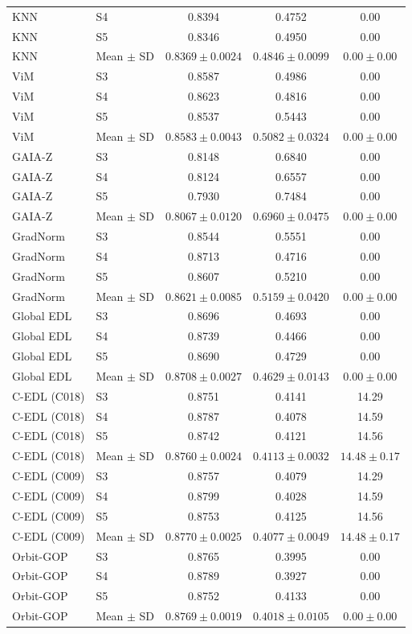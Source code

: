 \begin{longtable}{@{}llccc@{}}
KNN & S4 & 0.8394 & 0.4752 & 0.00 \\
KNN & S5 & 0.8346 & 0.4950 & 0.00 \\
KNN & Mean $\pm$ SD & $0.8369 \pm 0.0024$ & $0.4846 \pm 0.0099$ & $0.00 \pm 0.00$ \\
ViM & S3 & 0.8587 & 0.4986 & 0.00 \\
ViM & S4 & 0.8623 & 0.4816 & 0.00 \\
ViM & S5 & 0.8537 & 0.5443 & 0.00 \\
ViM & Mean $\pm$ SD & $0.8583 \pm 0.0043$ & $0.5082 \pm 0.0324$ & $0.00 \pm 0.00$ \\
GAIA-Z & S3 & 0.8148 & 0.6840 & 0.00 \\
GAIA-Z & S4 & 0.8124 & 0.6557 & 0.00 \\
GAIA-Z & S5 & 0.7930 & 0.7484 & 0.00 \\
GAIA-Z & Mean $\pm$ SD & $0.8067 \pm 0.0120$ & $0.6960 \pm 0.0475$ & $0.00 \pm 0.00$ \\
GradNorm & S3 & 0.8544 & 0.5551 & 0.00 \\
GradNorm & S4 & 0.8713 & 0.4716 & 0.00 \\
GradNorm & S5 & 0.8607 & 0.5210 & 0.00 \\
GradNorm & Mean $\pm$ SD & $0.8621 \pm 0.0085$ & $0.5159 \pm 0.0420$ & $0.00 \pm 0.00$ \\
Global EDL & S3 & 0.8696 & 0.4693 & 0.00 \\
Global EDL & S4 & 0.8739 & 0.4466 & 0.00 \\
Global EDL & S5 & 0.8690 & 0.4729 & 0.00 \\
Global EDL & Mean $\pm$ SD & $0.8708 \pm 0.0027$ & $0.4629 \pm 0.0143$ & $0.00 \pm 0.00$ \\
C-EDL (C018) & S3 & 0.8751 & 0.4141 & 14.29 \\
C-EDL (C018) & S4 & 0.8787 & 0.4078 & 14.59 \\
C-EDL (C018) & S5 & 0.8742 & 0.4121 & 14.56 \\
C-EDL (C018) & Mean $\pm$ SD & $0.8760 \pm 0.0024$ & $0.4113 \pm 0.0032$ & $14.48 \pm 0.17$ \\
C-EDL (C009) & S3 & 0.8757 & 0.4079 & 14.29 \\
C-EDL (C009) & S4 & 0.8799 & 0.4028 & 14.59 \\
C-EDL (C009) & S5 & 0.8753 & 0.4125 & 14.56 \\
C-EDL (C009) & Mean $\pm$ SD & $0.8770 \pm 0.0025$ & $0.4077 \pm 0.0049$ & $14.48 \pm 0.17$ \\
Orbit-GOP & S3 & 0.8765 & 0.3995 & 0.00 \\
Orbit-GOP & S4 & 0.8789 & 0.3927 & 0.00 \\
Orbit-GOP & S5 & 0.8752 & 0.4133 & 0.00 \\
Orbit-GOP & Mean $\pm$ SD & $0.8769 \pm 0.0019$ & $0.4018 \pm 0.0105$ & $0.00 \pm 0.00$ \\
\end{longtable}
\endgroup

